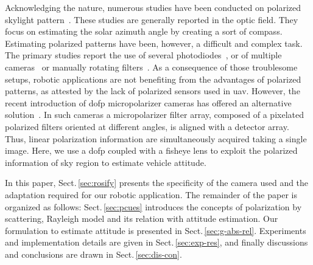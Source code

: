Acknowledging the nature, numerous studies have been conducted on polarized
skylight pattern~\cite{lambrinos2000insectnavigation, chu2009application,
  zhao2009novel, wang2015novel,chahl2013integration, ashkanazy2015bio,
  sturzl2012fisheye, ma2015skylightpolarization,
  miyazaki09sunlightpolarization, wang2014bionic,
  lu2015angle,hamaoui2017polarized}.  These studies are generally reported in
the optic field. They focus on estimating the solar azimuth angle by creating a
sort of compass.  Estimating polarized patterns have been, however, a difficult
and complex task.  The primary studies report the use of several
photodiodes~\cite{lambrinos2000insectnavigation, chu2009application,
  zhao2009novel, wang2015novel,chahl2013integration}, or of multiple
cameras~\cite{ashkanazy2015bio, sturzl2012fisheye, wang2014bionic} or manually
rotating filters~\cite{ma2015skylightpolarization,
  miyazaki09sunlightpolarization, lu2015angle, hamaoui2017polarized}.  As a
consequence of those troublesome setups, robotic applications are not
benefiting from the advantages of polarized patterns, as attested by the lack
of polarized sensors used in \gls{uav}.  However, the recent introduction of
\gls{dofp} micropolarizer cameras has offered an alternative
solution~\cite{nordin1999micropolarizer, nordin1999diffractive,
  millerd2006pixelated}.  In such cameras a micropolarizer filter array,
composed of a pixelated polarized filters oriented at different angles, is
aligned with a detector array. Thus, linear polarization information are
simultaneously acquired taking a single image. Here, we use a \gls{dofp}
coupled with a fisheye lens to exploit the polarized information of sky region
to estimate vehicle attitude.

In this paper, Sect.\,\ref{sec:rosify} presents the specificity of the camera
used and the adaptation required for our robotic application. The remainder of
the paper is organized as follows: Sect.\,\ref{sec:pcues} introduces the
concepts of polarization by scattering, Rayleigh model and its relation with
attitude estimation. Our formulation to estimate attitude is presented in
Sect.\,\ref{sec:g-abs-rel}. Experiments and implementation details are given
in Sect.\,\ref{sec:exp-res}, and finally discussions and conclusions are
drawn in Sect.\,\ref{sec:dis-con}.

























